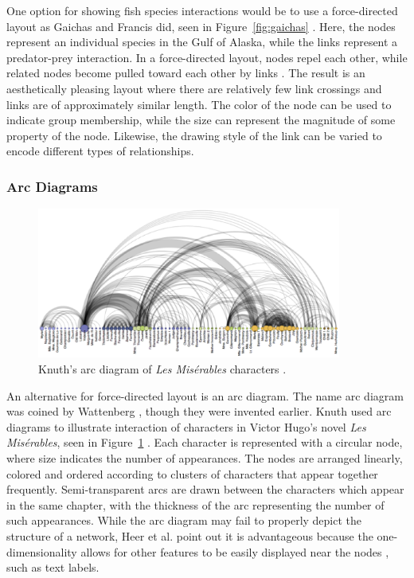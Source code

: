 
One option for showing fish species interactions would be to use a force-directed layout as Gaichas and Francis did, seen in Figure~\ref{fig:gaichas} \cite{gaichas2008}.  Here, the nodes represent an individual species in the Gulf of Alaska, while the links represent a predator-prey interaction.  In a force-directed layout, nodes repel each other, while related nodes become pulled toward each other by links \cite{heer2010}.  The result is an aesthetically pleasing layout where there are relatively few link crossings and links are of approximately similar length.  The color of the node can be used to indicate group membership, while the size can represent the magnitude of some property of the node.  Likewise, the drawing style of the link can be varied to encode different types of relationships. 

\subsubsection{Arc Diagrams}

\begin{figure}[h]
	\centering
	\includegraphics[width=10cm]{figures/eps/arcdiagram.eps}
	\caption{Knuth's arc diagram of \textit{Les Mis\'erables} characters \cite{knuth1993}.}
	\label{fig:arcdiagram}
\end{figure}

An alternative for force-directed layout is an arc diagram.  The name arc diagram was coined by Wattenberg \cite{wattenberg2002}, though they were invented earlier.  Knuth used arc diagrams to illustrate interaction of characters in Victor Hugo's novel \textit{Les} \textit{Mis\'erables}, seen in Figure~\ref{fig:arcdiagram} \cite{knuth1993}.  Each character is represented with a circular node, where size indicates the number of appearances.  The nodes are arranged linearly, colored and ordered according to clusters of characters that appear together frequently.  Semi-transparent arcs are drawn between the characters which appear in the same chapter, with the thickness of the arc representing the number of such appearances.  While the arc diagram may fail to properly depict the structure of a network, Heer et al. point out it is advantageous because the one-dimensionality allows for other features to be easily displayed near the nodes \cite{heer2010}, such as text labels.


